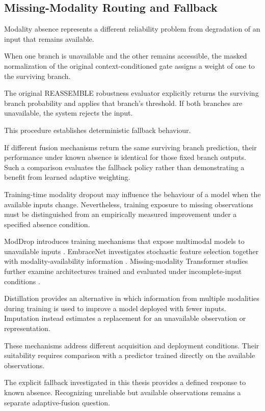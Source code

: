 \subsection{Missing-Modality Routing and Fallback}

Modality absence represents a different reliability problem from degradation of an input that remains available.

When one branch is unavailable and the other remains accessible, the masked normalization of the original context-conditioned gate assigns a weight of one to the surviving branch.

The original REASSEMBLE robustness evaluator explicitly returns the surviving branch probability and applies that branch’s threshold. If both branches are unavailable, the system rejects the input.

This procedure establishes deterministic fallback behaviour.

If different fusion mechanisms return the same surviving branch prediction, their performance under known absence is identical for those fixed branch outputs. Such a comparison evaluates the fallback policy rather than demonstrating a benefit from learned adaptive weighting.

Training-time modality dropout may influence the behaviour of a model when the available inputs change. Nevertheless, training exposure to missing observations must be distinguished from an empirically measured improvement under a specified absence condition.

ModDrop introduces training mechanisms that expose multimodal models to unavailable inputs \parencite{P005}. EmbraceNet investigates stochastic feature selection together with modality-availability information \parencite{P007}. Missing-modality Transformer studies further examine architectures trained and evaluated under incomplete-input conditions \parencite{P016}.

Distillation provides an alternative in which information from multiple modalities during training is used to improve a model deployed with fewer inputs. Imputation instead estimates a replacement for an unavailable observation or representation.

These mechanisms address different acquisition and deployment conditions. Their suitability requires comparison with a predictor trained directly on the available observations.

The explicit fallback investigated in this thesis provides a defined response to known absence. Recognizing unreliable but available observations remains a separate adaptive-fusion question.

